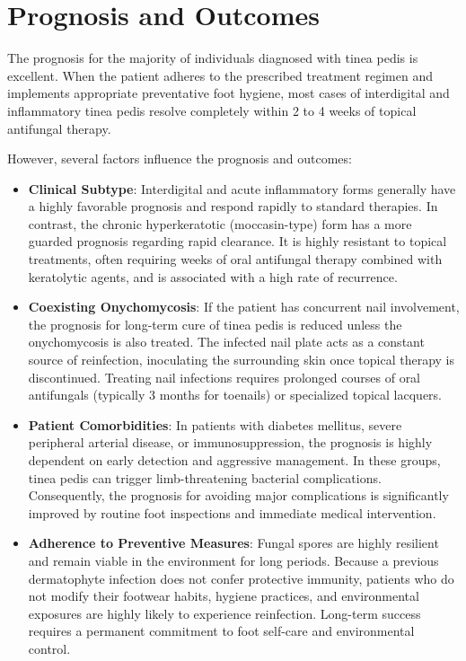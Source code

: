 \section*{Prognosis and Outcomes}
The prognosis for the majority of individuals diagnosed with tinea pedis is excellent. When the patient adheres to the prescribed treatment regimen and implements appropriate preventative foot hygiene, most cases of interdigital and inflammatory tinea pedis resolve completely within 2 to 4 weeks of topical antifungal therapy.

However, several factors influence the prognosis and outcomes:
\begin{itemize}
    \item \textbf{Clinical Subtype}: Interdigital and acute inflammatory forms generally have a highly favorable prognosis and respond rapidly to standard therapies. In contrast, the chronic hyperkeratotic (moccasin-type) form has a more guarded prognosis regarding rapid clearance. It is highly resistant to topical treatments, often requiring weeks of oral antifungal therapy combined with keratolytic agents, and is associated with a high rate of recurrence.
    \item \textbf{Coexisting Onychomycosis}: If the patient has concurrent nail involvement, the prognosis for long-term cure of tinea pedis is reduced unless the onychomycosis is also treated. The infected nail plate acts as a constant source of reinfection, inoculating the surrounding skin once topical therapy is discontinued. Treating nail infections requires prolonged courses of oral antifungals (typically 3 months for toenails) or specialized topical lacquers.
    \item \textbf{Patient Comorbidities}: In patients with diabetes mellitus, severe peripheral arterial disease, or immunosuppression, the prognosis is highly dependent on early detection and aggressive management. In these groups, tinea pedis can trigger limb-threatening bacterial complications. Consequently, the prognosis for avoiding major complications is significantly improved by routine foot inspections and immediate medical intervention.
    \item \textbf{Adherence to Preventive Measures}: Fungal spores are highly resilient and remain viable in the environment for long periods. Because a previous dermatophyte infection does not confer protective immunity, patients who do not modify their footwear habits, hygiene practices, and environmental exposures are highly likely to experience reinfection. Long-term success requires a permanent commitment to foot self-care and environmental control.
\end{itemize}


